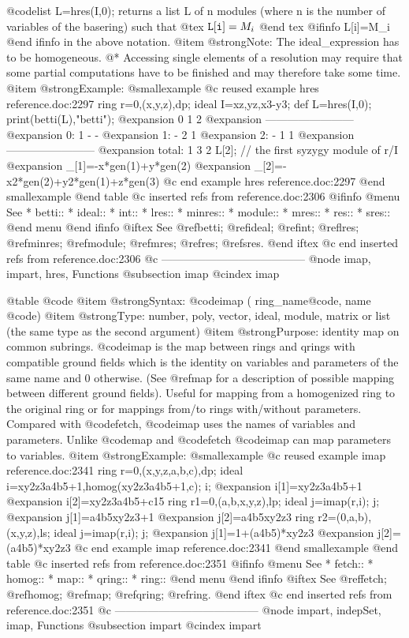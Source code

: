 {@code{list L=hres(I,0);} returns a list L of n modules (where n is the
number of variables of the basering) such that
@tex
${\tt L[i]}=M_i$
@end tex
@ifinfo
L[i]=M_i
@end ifinfo
in the above notation.
@item @strong{Note:}
The ideal_expression has to be homogeneous.
@* Accessing single elements of a resolution may require that some partial
computations have to be finished and may therefore take some time.
@item @strong{Example:}
@smallexample
@c reused example hres reference.doc:2297 
  ring r=0,(x,y,z),dp;
  ideal I=xz,yz,x3-y3;
  def L=hres(I,0);
  print(betti(L),"betti");
@expansion{}            0     1     2
@expansion{} ------------------------
@expansion{}     0:     1     -     -
@expansion{}     1:     -     2     1
@expansion{}     2:     -     1     1
@expansion{} ------------------------
@expansion{} total:     1     3     2
  L[2];     // the first syzygy module of r/I
@expansion{} _[1]=-x*gen(1)+y*gen(2)
@expansion{} _[2]=-x2*gen(2)+y2*gen(1)+z*gen(3)
@c end example hres reference.doc:2297
@end smallexample
@end table
@c inserted refs from reference.doc:2306
@ifinfo
@menu
See
* betti::
* ideal::
* int::
* lres::
* minres::
* module::
* mres::
* res::
* sres::
@end menu
@end ifinfo
@iftex
See
@ref{betti};
@ref{ideal};
@ref{int};
@ref{lres};
@ref{minres};
@ref{module};
@ref{mres};
@ref{res};
@ref{sres}.
@end iftex
@c end inserted refs from reference.doc:2306
@c ---------------------------------------
@node imap, impart, hres, Functions
@subsection imap
@cindex imap

@table @code
@item @strong{Syntax:}
@code{imap (} ring_name@code{,} name @code{)}
@item @strong{Type:}
number, poly, vector, ideal, module, matrix or list
(the same type as the second argument)
@item @strong{Purpose:}
identity map on common subrings.  @code{imap} is the map between rings
and qrings with compatible ground fields which is the identity on
variables and parameters of the same name and 0 otherwise.
(See @ref{map} for a description of possible mapping between
different ground fields).
Useful for mapping from a homogenized ring to the original ring or
for mappings from/to rings with/without parameters. Compared with
@code{fetch}, @code{imap} uses the names of variables and parameters.
Unlike @code{map} and @code{fetch} @code{imap} can map parameters to variables.
@item @strong{Example:}
@smallexample
@c reused example imap reference.doc:2341 
  ring r=0,(x,y,z,a,b,c),dp;
  ideal i=xy2z3a4b5+1,homog(xy2z3a4b5+1,c); i;
@expansion{} i[1]=xy2z3a4b5+1
@expansion{} i[2]=xy2z3a4b5+c15
  ring r1=0,(a,b,x,y,z),lp;
  ideal j=imap(r,i); j;
@expansion{} j[1]=a4b5xy2z3+1
@expansion{} j[2]=a4b5xy2z3
  ring r2=(0,a,b),(x,y,z),ls;
  ideal j=imap(r,i); j;
@expansion{} j[1]=1+(a4b5)*xy2z3
@expansion{} j[2]=(a4b5)*xy2z3
@c end example imap reference.doc:2341
@end smallexample
@end table
@c inserted refs from reference.doc:2351
@ifinfo
@menu
See
* fetch::
* homog::
* map::
* qring::
* ring::
@end menu
@end ifinfo
@iftex
See
@ref{fetch};
@ref{homog};
@ref{map};
@ref{qring};
@ref{ring}.
@end iftex
@c end inserted refs from reference.doc:2351
@c ---------------------------------------
@node impart, indepSet, imap, Functions
@subsection impart
@cindex impart

}
